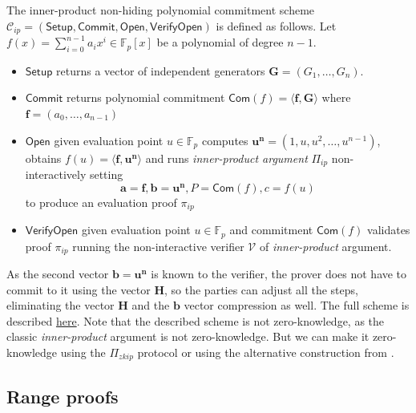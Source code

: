 \documentclass[../../book.tex]{subfiles}
\begin{document}
\begin{definition}
    The inner-product non-hiding polynomial commitment scheme $\mathcal{C}_{ip} = (\mathsf{Setup, Commit, Open, VerifyOpen})$ is defined as follows. Let $f(x) = \sum_{i=0}^{n-1} a_i x^i \in \mathbb{F}_p[x]$ be a polynomial of degree $n-1$.
    \begin{itemize}
        \item $\mathsf{Setup}$ returns a vector of independent generators $\mathbf{G} = (G_1, \dots, G_n)$.
        \item $\mathsf{Commit}$ returns polynomial commitment $\mathsf{Com}(f) = \langle \mathbf{f}, \mathbf{G} \rangle$ where $\mathbf{f} = (a_0, \dots, a_{n-1})$
        \item $\mathsf{Open}$ given evaluation point $u \in \mathbb{F}_p$ computes $\mathbf{u^n} = (1, u, u^2, \dots, u^{n-1})$,  obtains $f(u) = \langle \mathbf{f, u^n} \rangle$ and runs \textit{inner-product argument} $\Pi_{ip}$ non-interactively setting 
        $$\mathbf{a} = \mathbf{f}, \mathbf{b} = \mathbf{u^n}, P = \mathsf{Com}(f), c = f(u)$$ 
        to produce an evaluation proof $\pi_{ip}$
        \item $\mathsf{VerifyOpen}$ given evaluation point $u \in \mathbb{F}_p$ and commitment $\mathsf{Com}(f)$ validates proof $\pi_{ip}$ running the non-interactive verifier $\mathcal{V}$ of \textit{inner-product} argument.
    \end{itemize}
\end{definition}

\begin{remark}
    As the second vector $\mathbf{b} = \mathbf{u^n}$ is known to the verifier, the prover does not have to commit to it using the vector $\mathbf{H}$, so the parties can adjust all the steps, eliminating the vector $\mathbf{H}$ and the $\mathbf{b}$ vector compression as well. The full scheme is described \href{https://www.zkdocs.com/docs/zkdocs/commitments/ipa-pcs/}{here}. Note that the described scheme is not zero-knowledge, as the classic \textit{inner-product} argument is not zero-knowledge. But we can make it zero-knowledge using the $\Pi_{zkip}$ protocol or using the alternative construction from .
\end{remark}

\subsection{Range proofs}\label{subsection:bulletproofs-range-proofs}
\end{document}
